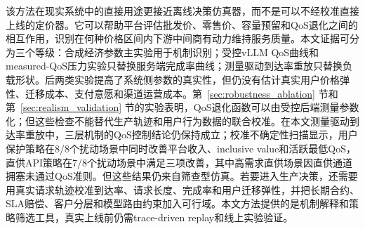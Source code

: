 \documentclass[UTF8,11pt]{ctexart}
\begin{document}
该方法在现实系统中的直接用途更接近离线决策仿真器，而不是可以不经校准直接上线的定价器。它可以帮助平台评估批发价、零售价、容量预留和QoS退化之间的相互作用，识别在何种价格区间内下游中间商有动力维持服务质量。本文证据可分为三个等级：合成经济参数主实验用于机制识别；受控vLLM QoS曲线和measured-QoS压力实验只替换服务端完成率曲线；测量驱动到达率重放只替换负载形状。后两类实验提高了系统侧参数的真实性，但仍没有估计真实用户价格弹性、迁移成本、支付意愿和渠道运营成本。第~\ref{sec:robustness_ablation} 节和第~\ref{sec:realism_validation} 节的实验表明，QoS退化函数可以由受控后端测量参数化；但这些检查不能替代生产轨迹和用户行为数据的联合校准。在本文测量驱动到达率重放中，三层机制的QoS控制结论仍保持成立；校准不确定性扫描显示，用户保护策略在8/8个扰动场景中同时改善平台收入、inclusive value和活跃最低QoS，直供API策略在7/8个扰动场景中满足三项改善，其中高需求直供场景因直供通道拥塞未通过QoS准则。但这些结果仍来自筛查型仿真。若要进入生产决策，还需要用真实请求轨迹校准到达率、请求长度、完成率和用户迁移弹性，并把长期合约、SLA赔偿、客户分层和模型路由约束加入可行域。本文方法提供的是机制解释和策略筛选工具，真实上线前仍需trace-driven replay和线上实验验证。
\end{document}
